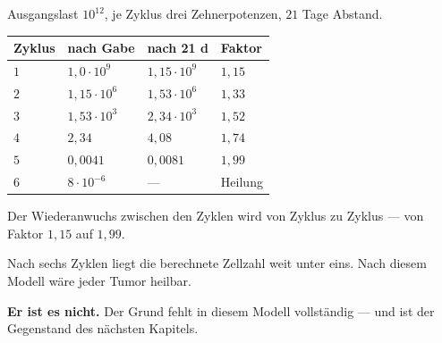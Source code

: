\begin{merksatz}
Ausgangslast $10^{12}$, je Zyklus drei Zehnerpotenzen, $21$ Tage Abstand.

\begin{center}
{\small
\renewcommand{\arraystretch}{1.46}
\begin{tabular}{@{}P{1.6cm}P{2.2cm}P{2.4cm}P{1.8cm}@{}}
\toprule
\textbf{Zyklus} & \textbf{nach Gabe} & \textbf{nach 21 d} & \textbf{Faktor}\\
\midrule
$1$ & $1{,}0\cdot10^{9}$ & $1{,}15\cdot10^{9}$ & $1{,}15$\\
$2$ & $1{,}15\cdot10^{6}$ & $1{,}53\cdot10^{6}$ & $1{,}33$\\
$3$ & $1{,}53\cdot10^{3}$ & $2{,}34\cdot10^{3}$ & $1{,}52$\\
$4$ & $2{,}34$ & $4{,}08$ & $1{,}74$\\
$5$ & $0{,}0041$ & $0{,}0081$ & $1{,}99$\\
$6$ & $8\cdot10^{-6}$ & --- & \textcolor{gruen}{Heilung}\\
\bottomrule
\end{tabular}}
\end{center}

Der Wiederanwuchs zwischen den Zyklen wird von Zyklus zu Zyklus  --- von Faktor $1{,}15$ auf $1{,}99$.

\begin{center}
\begin{minipage}{0.88\textwidth}
\end{minipage}
\end{center}

Nach sechs Zyklen liegt die berechnete Zellzahl weit unter eins. Nach diesem Modell wäre jeder Tumor heilbar.

\begin{center}
\begin{minipage}{0.9\textwidth}
\textbf{Er ist es nicht.} Der Grund fehlt in diesem Modell vollständig --- und ist der Gegenstand des nächsten Kapitels.
\end{minipage}
\end{center}
\end{merksatz}

